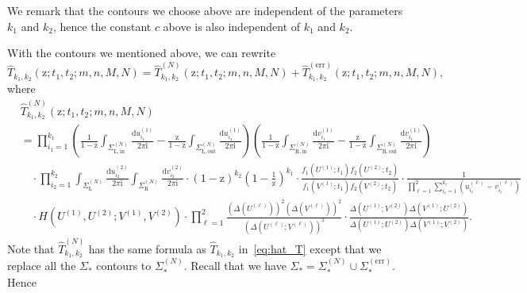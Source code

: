 \documentclass{article}
\numberwithin{equation}{section}
\newcommand{\ddbar}[2]{\frac{{\mathrm d}#1}{2\pi {\mathrm i}#2}}
\newcommand{\exe}{\mathrm{err}}
\newcommand{\inn}{\mathrm{in}}
\newcommand{\LL}{\mathrm{L}}
\newcommand{\out}{\mathrm{out}}
\newcommand{\RR}{\mathrm{R}}
\begin{document}
We remark that the contours we choose above are independent of the parameters $k_1$ and $k_2$, hence the constant $c$ above is also independent of $k_1$ and $k_2$.


\bigskip

With the contours we mentioned above, we can rewrite
\begin{equation*}
	\hat T_{k_1,k_2}(\mathrm{z};t_1,t_2;m,n,M,N) =\hat T_{k_1,k_2}^{(N)}(\mathrm{z};t_1,t_2;m,n,M,N) +\hat T_{k_1,k_2}^{(\exe)}(\mathrm{z};t_1,t_2;m,n,M,N),
\end{equation*}
where
\begin{equation}
	\label{eq:hat_TN}
	\begin{split}
		&\hat T_{k_1,k_2}^{(N)}(\mathrm{z};t_1,t_2;m,n,M,N)\\
		&=
		\prod_{i_1=1}^{k_1}     
		\left(  \frac{1}{1-\mathrm{z}} \int_{\Sigma_{\LL,\inn}^{(N)}} 	    
		\ddbar{u^{(1)}_{i_1}}{}   
		-\frac{\mathrm{z}}{1-\mathrm{z}} \int_{\Sigma_{\LL,\out}^{(N)}} \ddbar{u^{(1)}_{i_1}}{}
		\right)
		\left(  \frac{1}{1-\mathrm{z}}  \int_{\Sigma_{\RR,\inn}^{(N)}}  
		\ddbar{v^{(1)}_{i_1}}{}
		-\frac{\mathrm{z}}{1-\mathrm{z}}   \int_{\Sigma_{\RR,\out}^{(N)}}
		\ddbar{v^{(1)}_{i_1}}{}
		\right)
		\\
		&\quad \cdot 
		\prod_{i_2=1}^{k_2}  
		\int_{\Sigma_\LL^{(N)}} \ddbar{u^{(2)}_{i_2}}{} 
		\int_{\Sigma_\RR^{(N)}} \ddbar{v^{(2)}_{i_2}}{} 
		\cdot    
		\left(1-\mathrm{z}\right)^{k_2}
		\left(1-\frac{1}{\mathrm{z}}\right)^{k_1}
		\cdot 
		\frac{f_1(U^{(1)};t_1)f_2(U^{(2)};t_2)}{f_1(V^{(1)};t_1)f_2(V^{(2)};t_2)}
		\cdot \frac{1}{\prod_{\ell=1}^2\sum_{i_\ell=1}^{k_\ell}(u_{i_\ell}^{(\ell)} -v_{i_\ell}^{(\ell)})}
		\\
		&\quad \cdot H(U^{(1)},U^{(2)};V^{(1)},V^{(2)})\cdot 
		\prod_{\ell=1}^2
		\frac{\left( \Delta(U^{(\ell)}) \right)^2
			\left( \Delta(V^{(\ell)}) \right)^2
		}
		{\left( \Delta(U^{(\ell)}; V^{(\ell)}) \right)^2}
		\cdot 
		\frac{\Delta(U^{(1)};V^{(2)})\Delta(V^{(1)};U^{(2)})}
		{\Delta(U^{(1)};U^{(2)})\Delta(V^{(1)};V^{(2)})}.
	\end{split}
\end{equation}
Note that $\hat T_{k_1,k_2}^{(N)}$ has the same formula as $\hat T_{k_1,k_2}$ in~\eqref{eq:hat_T} except that we replace all the $\Sigma_*$ contours to $\Sigma_*^{(N)}$. Recall that we have $\Sigma_*=\Sigma_*^{(N)}\cup\Sigma_*^{(\exe)}$. Hence
\end{document}
